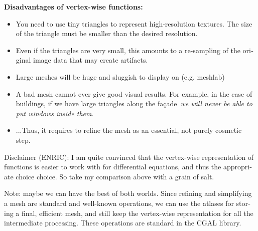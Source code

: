 \documentclass{article}
\def\R{\mathbf{R}} %
\begin{document}
\begin{otherlanguage}{british}
{\bf Disadvantages of vertex-wise functions:}

\begin{itemize}
	\item You need to use tiny triangles to represent high-resolution
		textures.  The size of the triangle must be smaller than the
		desired resolution.
	\item Even if the triangles are very small, this amounts to a
		re-sampling of the original image data that may create
		artifacts.
	\item Large meshes will be huge and sluggish to display on (e.g.
		meshlab)
	\item A bad mesh cannot ever give good visual results.  For example,
		in the case of buildings, if we have large triangles along
		the façade~\emph{we will never be able to put windows inside
		them}.
	\item ...Thus, it requires to refine the mesh as an essential, not
		purely cosmetic step.
\end{itemize}

Disclaimer (ENRIC): I am quite convinced that the vertex-wise representation
of functions is easier to work with for differential equations, and thus the
appropriate choice choice.  So take my comparison above with a grain of salt.

Note: maybe we can have the best of both worlds.  Since refining and
simplifying a mesh are standard and well-known operations, we can use the
atlases for storing a final, efficient mesh, and still keep the vertex-wise
representation for all the intermediate processing.  These operations are
standard in the CGAL library.

\end{otherlanguage}



%
%
%
\end{document}
